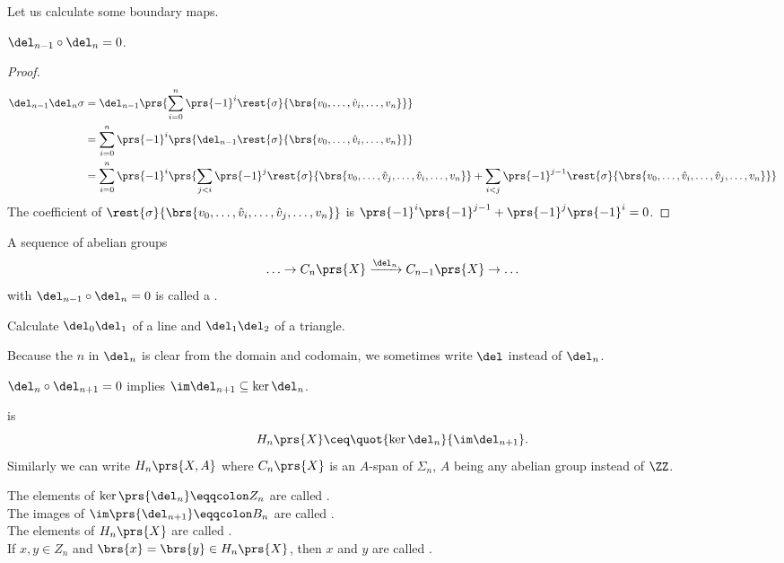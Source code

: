\documentclass[10pt,a4paper,twoside,openany,hidelinks]{book}
\begin{document}
\begin{example}
Let us calculate some boundary maps.
\end{example}
\begin{lemma}
$\del_{n-1} \circ \del_n = 0$.
\end{lemma}
\begin{proof}
\begin{align*}
\del_{n-1} \del_n \sigma &= \del_{n-1} \prs{\sum_{i=0}^n \prs{-1}^i \rest{\sigma}{\brs{v_0, \ldots, \hat{v}_i, \ldots, v_n}}} \\
&= \sum_{i=0}^n \prs{-1}^i \prs{\del_{n-1} \rest{\sigma}{\brs{v_0, \ldots, \hat{v}_i, \ldots, v_n}}} \\
&= \sum_{i=0}^n \prs{-1}^i \prs{\sum_{j < i} \prs{-1}^j \rest{\sigma}{\brs{v_0, \ldots, \hat{v}_j, \ldots, \hat{v}_i, \ldots, v_n}} + \sum_{i<j} \prs{-1}^{j-1} \rest{\sigma}{\brs{v_0, \ldots, \hat{v}_i, \ldots, \hat{v}_j, \ldots, v_n}}}
\end{align*}
The coefficient of $\rest{\sigma}{\brs{v_0, \ldots, \hat{v}_i, \ldots, \hat{v}_j, \ldots, v_n}}$ is $\prs{-1}^i\prs{-1}^{j-1} + \prs{-1}^j \prs{-1}^i = 0$.
\end{proof}
\begin{definition}
A sequence of abelian groups
\[\ldots \rightarrow C_n\prs{X} \xrightarrow{\del_n} C_{n-1}\prs{X} \rightarrow \ldots\]
with $\del_{n-1} \circ \del_n = 0$
is called a .
\end{definition}
\begin{exercise}
Calculate $\del_0 \del_1$ of a line and $\del_1 \del_2$ of a triangle.
\end{exercise}
\begin{remark}
Because the $n$ in $\del_n$ is clear from the domain and codomain, we sometimes write $\del$ instead of $\del_n$.
\end{remark}
\begin{remark}
$\del_n \circ \del_{n+1} = 0$ implies $\im \del_{n+1} \subseteq \ker \del_n$.
\end{remark}
\begin{definition}
 is
\[H_n\prs{X} \ceq \quot{\ker \del_n}{\im \del_{n+1}} \text{.}\]
Similarly we can write $H_n\prs{X,A}$ where $C_n\prs{X}$ is an $A$-span of $\Sigma_n$, $A$ being any abelian group instead of $\ZZ$.
\end{definition}
\begin{definition}
The elements of $\ker\prs{\del_n} \eqqcolon Z_n$ are called .\\
The images of $\im\prs{\del_{n+1}} \eqqcolon B_n$ are called .\\
The elements of $H_n\prs{X}$ are called .\\
If $x,y \in Z_n$ and $\brs{x} = \brs{y} \in H_n\prs{X}$, then $x$ and $y$ are called .
\end{definition}
\end{document}
